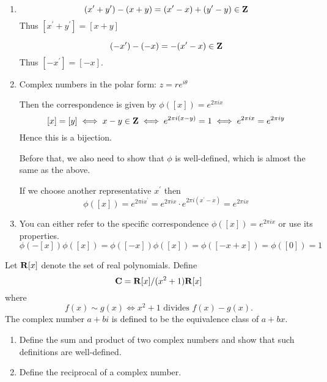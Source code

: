 \begin{solution} \ 
\begin{enumerate}[label=(\alph*)]
\item 
\[ (x^\prime+y^\prime)-(x+y)=(x^\prime-x)+(y^\prime-y)\in \mathbf Z \]
Thus $[x^\prime+y^\prime]=[x+y]$

\[ (-x^\prime)-(-x)=-(x^\prime-x)\in \mathbf Z \]
Thus $[-x^\prime]=[-x]$.

\item Complex numbers in the polar form: $z=re^{i\theta}$

Then the correspondence is given by $\phi([x])=e^{2\pi ix}$
\[ [x]=[y] \iff x-y\in \mathbf Z \iff e^{2\pi i(x-y)}=1 \iff e^{2\pi ix}=e^{2\pi iy} \]
Hence this is a bijection.

Before that, we also need to show that $\phi$ is well-defined, which is almost the same as the above.

If we choose another representative $x^\prime$ then
\[ \phi([x])=e^{2\pi ix^\prime} = e^{2\pi ix}\cdot e^{2\pi i(x^\prime-x)} = e^{2\pi ix} \]

\item You can either refer to the specific correspondence $\phi([x])=e^{2\pi ix}$ or use its properties.
\[ \phi(-[x])\phi([x]) = \phi([-x])\phi([x]) = \phi([-x+x]) = \phi([0]) = 1 \]
\end{enumerate}
\end{solution}
\pagebreak

\begin{prbm}
Let $\mathbf R[x]$ denote the set of real polynomials. Define
\[ \mathbf C=\mathbf R[x]/(x^2+1)\mathbf R[x] \]
where
\[ f(x)\sim g(x) \iff x^2+1 \text{ divides } f(x)-g(x). \]
The complex number $a+bi$ is defined to be the equivalence class of $a+bx$.
\begin{enumerate}[label=(\alph*)]
\item Define the sum and product of two complex numbers and show that such definitions are well-defined.
\item Define the reciprocal of a complex number.
\end{enumerate}
\end{prbm}
\pagebreak